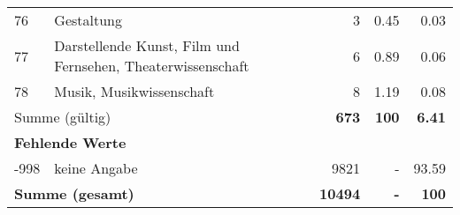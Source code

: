 \begin{longtable}{lXrrr}
        76 & \multicolumn{1}{X}{Gestaltung} & %
          \num{3} &
          \num[round-mode=places,round-precision=2]{0,45} &
          \num[round-mode=places,round-precision=2]{0,03} \\

        77 & \multicolumn{1}{X}{Darstellende Kunst, Film und Fernsehen, Theaterwissenschaft} & %
          \num{6} &
          \num[round-mode=places,round-precision=2]{0,89} &
          \num[round-mode=places,round-precision=2]{0,06} \\

        78 & \multicolumn{1}{X}{Musik, Musikwissenschaft} & %
          \num{8} &
          \num[round-mode=places,round-precision=2]{1,19} &
          \num[round-mode=places,round-precision=2]{0,08} \\

     \midrule
     \multicolumn{2}{l}{Summe (gültig)} &
       \textbf{\num{673}} &
     \textbf{100} &
       \textbf{\num[round-mode=places,round-precision=2]{6,41}} \\
     \multicolumn{5}{l}{\textbf{Fehlende Werte}}\\
       -998 &
       keine Angabe &
         \num{9821} &
        - &
         \num[round-mode=places,round-precision=2]{93,59} \\
     \midrule
     \multicolumn{2}{l}{\textbf{Summe (gesamt)}} &
          \textbf{\num{10494}} &
        \textbf{-} &
        \textbf{100} \\
     \bottomrule
     \end{longtable}
     
